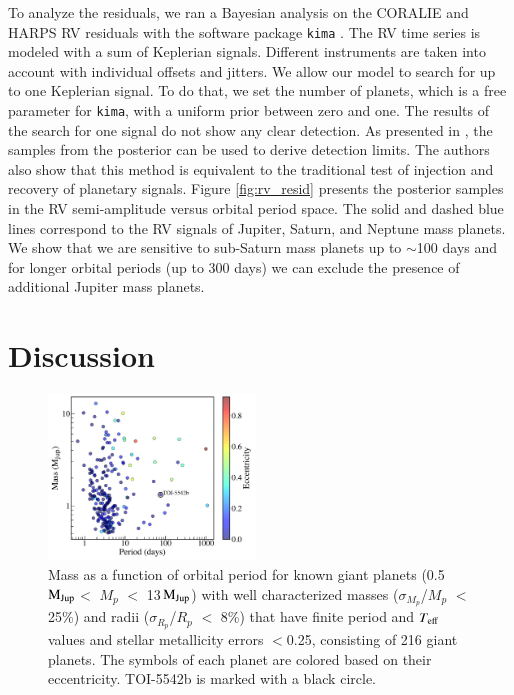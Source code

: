 \documentclass{aa}
\newcommand{\teff}{\ensuremath{T_{\rm eff}}\xspace}
\newcommand{\mjup}{\mbox{$\mathrm{M_{\rm Jup}}$}\xspace}
\begin{document}
To analyze the residuals, we ran a Bayesian analysis on the CORALIE and HARPS RV residuals with the software package \texttt{kima} \citep{Faria2018}. The RV time series is modeled with a sum of Keplerian signals. Different instruments are taken into account with individual offsets and jitters. We allow our model to search for up to one Keplerian signal. To do that, we set the number of planets, which is a free parameter for \texttt{kima}, with a uniform prior between zero and one. The results of the search for one signal do not show any clear detection. As presented in \citet{Standing2022}, the samples from the posterior can be used to derive detection limits. The authors also show that this method is equivalent to the traditional test of injection and recovery of planetary signals. Figure \ref{fig:rv_resid} presents the posterior samples in the RV semi-amplitude versus orbital period space. The solid and dashed blue lines correspond to the RV signals of Jupiter, Saturn, and Neptune mass planets. We show that we are sensitive to sub-Saturn mass planets up to $\sim$100 days and for longer orbital periods (up to 300 days) we can exclude the presence of additional Jupiter mass planets.


\section{Discussion} \label{sec:discussion}

\begin{figure}
  \centering
  \includegraphics[width=0.49\textwidth]{figures/mass_period_ecc.pdf}
 \caption{Mass as a function of orbital period for known giant planets (0.5\,\mjup $<$ $M_p$ $<$ 13\,\mjup) with well characterized masses ($\sigma_{M_p}$/$M_p$ $<$ 25\%) and radii ($\sigma_{R_p}$/$R_p$ $<$ 8\%) that have finite period and \teff values and stellar metallicity errors $<$0.25, consisting of 216 giant planets. The symbols of each planet are colored based on their eccentricity. TOI-5542b is marked with a black circle.}
  \label{fig:mass_per}
\end{figure}
\end{document}

